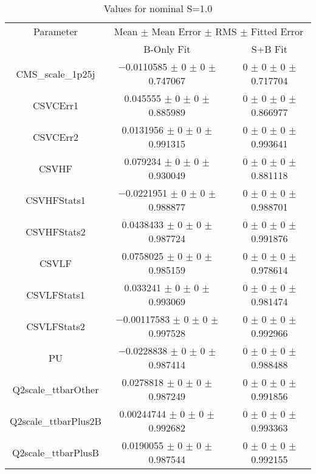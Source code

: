 \begin{table}
\centering
\caption{Values for nominal S=1.0}
\begin{tabular}{ccc}
\toprule
Parameter & \multicolumn{2}{c}{Mean $\pm$ Mean Error $\pm$ RMS $\pm$ Fitted Error}\\
 & B-Only Fit & S+B Fit\\
\midrule
CMS\_scale\_1p25j & \num{-0.0110585} $\pm$ \num{0} $\pm$ \num{0} $\pm$ \num{0.747067} & \num{0} $\pm$ \num{0} $\pm$ \num{0} $\pm$ \num{0.717704}\\
CSVCErr1 & \num{0.045555} $\pm$ \num{0} $\pm$ \num{0} $\pm$ \num{0.885989} & \num{0} $\pm$ \num{0} $\pm$ \num{0} $\pm$ \num{0.866977}\\
CSVCErr2 & \num{0.0131956} $\pm$ \num{0} $\pm$ \num{0} $\pm$ \num{0.991315} & \num{0} $\pm$ \num{0} $\pm$ \num{0} $\pm$ \num{0.993641}\\
CSVHF & \num{0.079234} $\pm$ \num{0} $\pm$ \num{0} $\pm$ \num{0.930049} & \num{0} $\pm$ \num{0} $\pm$ \num{0} $\pm$ \num{0.881118}\\
CSVHFStats1 & \num{-0.0221951} $\pm$ \num{0} $\pm$ \num{0} $\pm$ \num{0.988877} & \num{0} $\pm$ \num{0} $\pm$ \num{0} $\pm$ \num{0.988701}\\
CSVHFStats2 & \num{0.0438433} $\pm$ \num{0} $\pm$ \num{0} $\pm$ \num{0.987724} & \num{0} $\pm$ \num{0} $\pm$ \num{0} $\pm$ \num{0.991876}\\
CSVLF & \num{0.0758025} $\pm$ \num{0} $\pm$ \num{0} $\pm$ \num{0.985159} & \num{0} $\pm$ \num{0} $\pm$ \num{0} $\pm$ \num{0.978614}\\
CSVLFStats1 & \num{0.033241} $\pm$ \num{0} $\pm$ \num{0} $\pm$ \num{0.993069} & \num{0} $\pm$ \num{0} $\pm$ \num{0} $\pm$ \num{0.981474}\\
CSVLFStats2 & \num{-0.00117583} $\pm$ \num{0} $\pm$ \num{0} $\pm$ \num{0.997528} & \num{0} $\pm$ \num{0} $\pm$ \num{0} $\pm$ \num{0.992966}\\
PU & \num{-0.0228838} $\pm$ \num{0} $\pm$ \num{0} $\pm$ \num{0.987414} & \num{0} $\pm$ \num{0} $\pm$ \num{0} $\pm$ \num{0.988488}\\
Q2scale\_ttbarOther & \num{0.0278818} $\pm$ \num{0} $\pm$ \num{0} $\pm$ \num{0.987249} & \num{0} $\pm$ \num{0} $\pm$ \num{0} $\pm$ \num{0.991856}\\
Q2scale\_ttbarPlus2B & \num{0.00244744} $\pm$ \num{0} $\pm$ \num{0} $\pm$ \num{0.992682} & \num{0} $\pm$ \num{0} $\pm$ \num{0} $\pm$ \num{0.993363}\\
Q2scale\_ttbarPlusB & \num{0.0190055} $\pm$ \num{0} $\pm$ \num{0} $\pm$ \num{0.987544} & \num{0} $\pm$ \num{0} $\pm$ \num{0} $\pm$ \num{0.992155}\\

\end{tabular}
\end{table}
